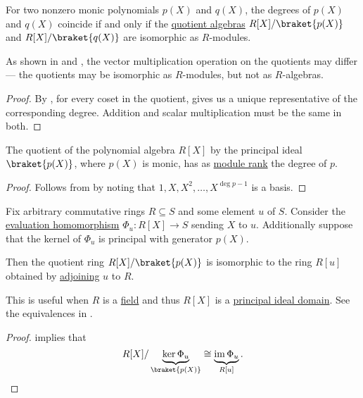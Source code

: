 \begin{corollary}\label{thm:polynomial_quotient_modules_vs_algebras}
  For two nonzero monic polynomials \( p(X) \) and \( q(X) \), the degrees of \( p(X) \) and \( q(X) \) coincide if and only if the \hyperref[def:algebra_over_ring/quotient]{quotient algebras} \( R[X] / \braket{ p(X) } \) and \( R[X] / \braket{ q(X) } \) are isomorphic as \( R \)-modules.
\end{corollary}
\begin{comments}
  \item As shown in  and , the vector multiplication operation on the quotients may differ --- the quotients may be isomorphic as \( R \)-modules, but not as \( R \)-algebras.
\end{comments}
\begin{proof}
  By , for every coset in the quotient,  gives us a unique representative of the corresponding degree. Addition and scalar multiplication must be the same in both.
\end{proof}

\begin{corollary}\label{thm:polynomial_quotient_module_dimension}
  The quotient of the polynomial algebra \( R[X] \) by the principal ideal \( \braket{ p(X) } \), where \( p(X) \) is monic, has as \hyperref[def:module_rank]{module rank} the degree of \( p \).
\end{corollary}
\begin{proof}
  Follows from  by noting that \( 1, X, X^2, \ldots, X^{\deg p-1} \) is a basis.
\end{proof}

\begin{proposition}\label{thm:adjoint_roots_and_quotients}
  Fix arbitrary commutative rings \( R \subseteq S \) and some element \( u \) of \( S \). Consider the \hyperref[con:evaluation_homomorphism]{evaluation homomorphism} \( \Phi_u: R[X] \to S \) sending \( X \) to \( u \). Additionally suppose that the kernel of \( \Phi_u \) is principal with generator \( p(X) \).

  Then the quotient ring \( R[X] / \braket{ p(X) } \) is isomorphic to the ring \( R[u] \) obtained by \hyperref[def:semiring_adjunction]{adjoining} \( u \) to \( R \).
\end{proposition}
\begin{comments}
  \item This is useful when \( R \) is a \hyperref[def:field]{field} and thus \( R[X] \) is a \hyperref[def:principal_ideal_domain]{principal ideal domain}. See the equivalences in .
\end{comments}
\begin{proof}
   implies that
  \begin{equation*}
    R[X] / \underbrace{\ker \Phi_u}_{\braket{ p(X) }} \cong \underbrace{\img \Phi_u}_{R[u]}.
  \end{equation*}
\end{proof}


